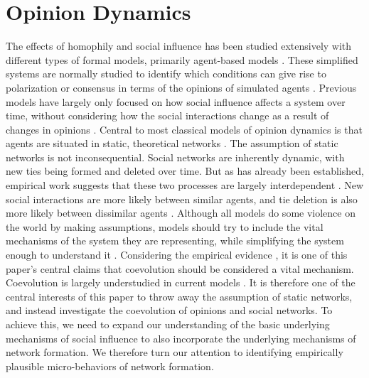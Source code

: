\documentclass{article}
\begin{document}
\section{Opinion Dynamics}
The effects of homophily and social influence has been studied extensively with different types of formal models, primarily agent-based models \cite{flache_models_2017,flache_between_2018,noorazar_classical_2020}. These simplified systems are normally studied to identify which conditions can give rise to polarization or consensus in terms of the opinions of simulated agents \cite{flache_models_2017}. Previous models have largely only focused on how social influence affects a system over time, without considering how the social interactions change as a result of changes in opinions \cite{galesic_integrating_2021,holme_nonequilibrium_2006,jalili_coevolution_2015}. Central to most classical models of opinion dynamics is that agents are situated in static, theoretical networks \cite{flache_models_2017}. The assumption of static networks is not inconsequential. Social networks are inherently dynamic, with new ties being formed and deleted over time.  But as has already been established, empirical work suggests that these two processes are largely interdependent \cite{bener_empirical_2016,kossinets_origins_2009}. New social interactions are more likely between similar agents, and tie deletion is also more likely between dissimilar agents \cite{kossinets_origins_2009}. 
Although all models do some violence on the world by making assumptions, models should try to include the vital mechanisms of the system they are representing, while simplifying the system enough to understand it \cite{epstein1999agent,smaldino_models_2016}. Considering the empirical evidence \cite{bener_empirical_2016,crandall_feedback_2008,kossinets_origins_2009}, it is one of this paper’s central claims that coevolution should be considered a vital mechanism. Coevolution is largely understudied in current models \cite{flache_models_2017,galesic_integrating_2021,sasahara_social_2021}. It is therefore one of the central interests of this paper to throw away the assumption of static networks, and instead investigate the coevolution of opinions and social networks. To achieve this, we need to expand our understanding of the basic underlying mechanisms of social influence to also incorporate the underlying mechanisms of network formation. We therefore turn our attention to identifying empirically plausible micro-behaviors of network formation. 
\end{document}
